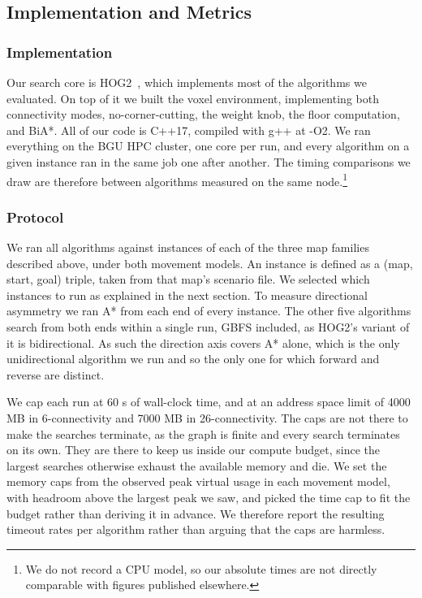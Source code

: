 \documentclass[letterpaper]{article} %
\begin{document}
\subsection{Implementation and Metrics}
\subsubsection{Implementation}
Our search core is HOG2~\cite{sturtevant2016hog2}, which implements most of the algorithms we evaluated. On top of it we built the voxel environment, implementing both connectivity modes, no-corner-cutting, the weight knob, the floor computation, and BiA*. All of our code is C++17, compiled with g++ at -O2. We ran everything on the BGU HPC cluster, one core per run, and every algorithm on a given instance ran in the same job one after another. The timing comparisons we draw are therefore between algorithms measured on the same node.\footnote{We do not record a CPU model, so our absolute times are not directly comparable with figures published elsewhere.}

\subsubsection{Protocol}
We ran all algorithms against instances of each of the three map families described above, under both movement models. An instance is defined as a (map, start, goal) triple, taken from that map's scenario file. We selected which instances to run as explained in the next section. To measure directional asymmetry we ran A* from each end of every instance. The other five algorithms search from both ends within a single run, GBFS included, as HOG2's variant of it is bidirectional. As such the direction axis covers A* alone, which is the only unidirectional algorithm we run and so the only one for which forward and reverse are distinct.

We cap each run at 60 s of wall-clock time, and at an address space limit of 4000 MB in 6-connectivity and 7000 MB in 26-connectivity. The caps are not there to make the searches terminate, as the graph is finite and every search terminates on its own. They are there to keep us inside our compute budget, since the largest searches otherwise exhaust the available memory and die. We set the memory caps from the observed peak virtual usage in each movement model, with headroom above the largest peak we saw, and picked the time cap to fit the budget rather than deriving it in advance. We therefore report the resulting timeout rates per algorithm rather than arguing that the caps are harmless.
\end{document}
